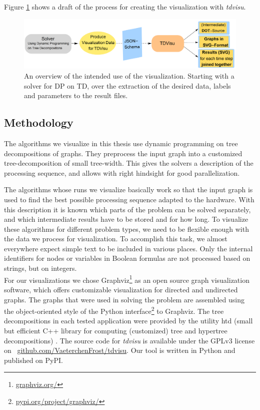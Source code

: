 \documentclass[a4paper, 12pt, bibliography=totoc]{scrartcl}
\begin{document}
Figure \ref{fig:overviewprog} shows a draft of the process for creating the visualization with \textit{tdvisu}.

\begin{figure}
	\centering
		\includegraphics[width=1\linewidth]{images/OverviewProgram.png}
		
	\caption[Visualization Overview]{An overview of the intended use of the visualization. Starting with a solver for DP on TD, over the extraction of the desired data, labels and parameters to the result files.}
	\label{fig:overviewprog}
\end{figure}

\newpage
\subsection{Methodology}

The algorithms we visualize in this thesis use dynamic programming on tree decompositions of graphs.
They preprocess the input graph into a customized tree-decomposition of small tree-width.
This gives the solvers a description of the processing sequence, and allows 
with right hindsight for good parallelization.

The algorithms whose runs we visualize basically work so that the input graph is used to find the best possible processing sequence adapted to the hardware.
With this description it is known which parts of the problem can be solved separately, and which intermediate results have to be stored and for how long. To visualize these algorithms for different problem types, we need to be flexible enough with the data we process for visualization. To accomplish this task, we almost everywhere expect simple text to be included in various places. Only the internal identifiers for nodes or variables in Boolean formulas are not processed based on strings, but on integers.\\

For our visualizations we chose {Graphviz}\footnote{\url{graphviz.org/}} as an open source graph visualization software, which offers customizable visualization for directed and undirected graphs.
The graphs that were used in solving the problem are assembled using the object-oriented style of the Python interface\footnote{\url{pypi.org/project/graphviz/}} to Graphviz.
The tree decompositions in each tested application were provided by the utility {htd} (small but efficient C++ library for computing (customized) tree and hypertree decompositions) \cite{htd}.
The source code for \textit{tdvisu} is available under the GPLv3 license \\on
\mbox{ \url{github.com/VaeterchenFrost/tdvisu}}. Our tool is written in Python and published on PyPI.
\end{document}
